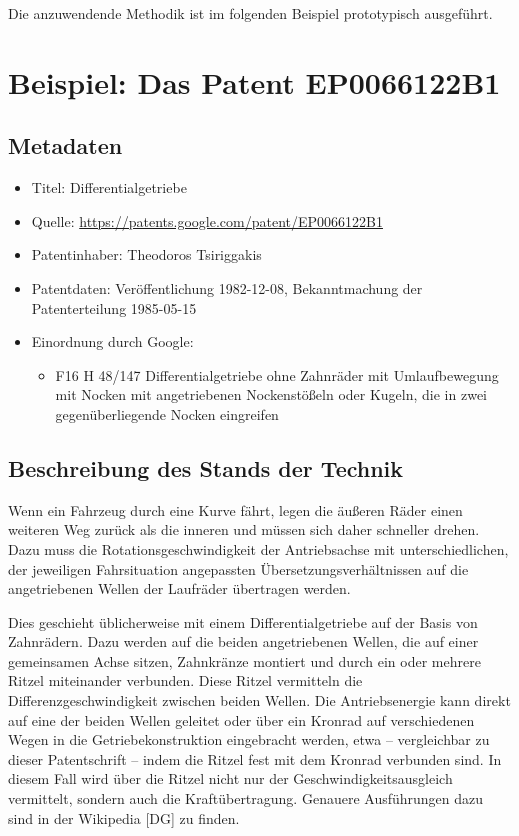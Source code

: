 \documentclass[11pt,a4paper]{article}
\begin{document}
Die anzuwendende Methodik ist im folgenden Beispiel prototypisch ausgeführt. 

\section{Beispiel: Das Patent EP0066122B1}

\subsection{Metadaten}
\begin{itemize}\itemsep0pt
\item Titel: Differentialgetriebe
\item Quelle: \url{https://patents.google.com/patent/EP0066122B1}
\item Patentinhaber: Theodoros Tsiriggakis
\item Patentdaten: Veröffentlichung 1982-12-08, Bekanntmachung der
  Patenterteilung 1985-05-15
\item Einordnung durch Google:
  \begin{itemize}
  \item F16 H 48/147 Differentialgetriebe ohne Zahnräder mit Umlaufbewegung
    mit Nocken mit angetriebenen Nockenstößeln oder Kugeln, die in zwei
    gegenüberliegende Nocken eingreifen
  \end{itemize}
\end{itemize}

\subsection{Beschreibung des Stands der Technik}

Wenn ein Fahrzeug durch eine Kurve fährt, legen die äußeren Räder einen
weiteren Weg zurück als die inneren und müssen sich daher schneller drehen.
Dazu muss die Rotationsgeschwindigkeit der Antriebsachse mit
unterschiedlichen, der jeweiligen Fahrsituation angepassten
Übersetzungsverhältnissen auf die angetriebenen Wellen der Laufräder
übertragen werden.

Dies geschieht üblicherweise mit einem Differentialgetriebe auf der Basis von
Zahnrädern. Dazu werden auf die beiden angetriebenen Wellen, die auf einer
gemeinsamen Achse sitzen, Zahnkränze montiert und durch ein oder mehrere
Ritzel miteinander verbunden.  Diese Ritzel vermitteln die
Differenzgeschwindigkeit zwischen beiden Wellen.  Die Antriebsenergie kann
direkt auf eine der beiden Wellen geleitet oder über ein Kronrad auf
verschiedenen Wegen in die Getriebekonstruktion eingebracht werden, etwa --
vergleichbar zu dieser Patentschrift -- indem die Ritzel fest mit dem Kronrad
verbunden sind.  In diesem Fall wird über die Ritzel nicht nur der
Geschwindigkeitsausgleich vermittelt, sondern auch die Kraftübertragung. 
Genauere Ausführungen dazu sind in der Wikipedia [DG] zu finden.
\end{document}
